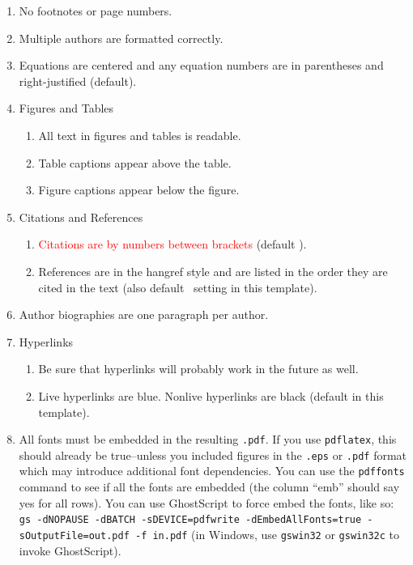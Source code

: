 \documentclass{scspaperproc}
\theoremstyle{scsthe}
\begin{document}
\begin{enumerate}
	\item No footnotes or page numbers.
	\item Multiple authors are formatted correctly.
	\item Equations are centered and any equation numbers are in parentheses and right-justified (default).
	\item Figures and Tables
  \begin{enumerate}
	  \item All text in figures and tables is readable.
	  \item Table captions appear above the table.
	  \item Figure captions appear below the figure.
	\end{enumerate}
	\item Citations and References
  \begin{enumerate}
	  \item \textcolor{red}{Citations are by numbers between brackets} (default \BibTeX). 
	  \item References are in the hangref style and are listed in the order they are cited in the text (also default \BibTeX\ setting in this template). 
	\end{enumerate}
	\item Author biographies are one paragraph per author.
	\item Hyperlinks
  \begin{enumerate}
	  \item Be sure that hyperlinks will probably work in the future as well.
	  \item Live hyperlinks are blue. Nonlive hyperlinks are black (default in this template).
	\end{enumerate}
	\item All fonts must be embedded in the resulting \texttt{.pdf}. If you use \texttt{pdflatex}, this should already be true--unless you included figures in the \texttt{.eps} or \texttt{.pdf} format which may introduce additional font dependencies. You can use the \texttt{pdffonts} command to see if all the fonts are embedded (the column ``emb'' should say yes for all rows). You can use GhostScript to force embed the fonts, like so: {\texttt{gs -dNOPAUSE -dBATCH -sDEVICE=pdfwrite -dEmbedAllFonts=true -sOutputFile=out.pdf -f in.pdf}} (in Windows, use \texttt{gswin32} or \texttt{gswin32c} to invoke GhostScript).
\end{enumerate}
\end{document}

